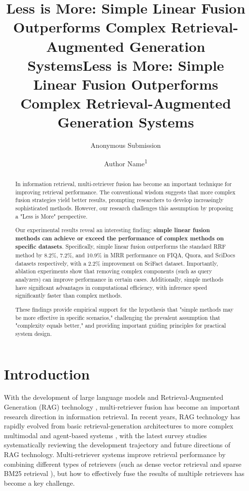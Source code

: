 \documentclass[letterpaper]{article} %
\title{Less is More: Simple Linear Fusion Outperforms Complex Retrieval-Augmented Generation Systems}
\title{Less is More: Simple Linear Fusion Outperforms Complex Retrieval-Augmented Generation Systems}
\author{
    Anonymous Submission
}
\author{
    Author Name\textsuperscript{\rm 1}
}
\begin{document}
\maketitle

\begin{abstract}
In information retrieval, multi-retriever fusion has become an important technique for improving retrieval performance. The conventional wisdom suggests that more complex fusion strategies yield better results, prompting researchers to develop increasingly sophisticated methods. However, our research challenges this assumption by proposing a "Less is More" perspective.

Our experimental results reveal an interesting finding: \textbf{simple linear fusion methods can achieve or exceed the performance of complex methods on specific datasets}. Specifically, simple linear fusion outperforms the standard RRF method by 8.2\%, 7.2\%, and 10.9\% in MRR performance on FIQA, Quora, and SciDocs datasets respectively, with a 2.2\% improvement on SciFact dataset. Importantly, ablation experiments show that removing complex components (such as query analyzers) can improve performance in certain cases. Additionally, simple methods have significant advantages in computational efficiency, with inference speed significantly faster than complex methods.

These findings provide empirical support for the hypothesis that "simple methods may be more effective in specific scenarios," challenging the prevalent assumption that "complexity equals better," and providing important guiding principles for practical system design.
\end{abstract}

\ifdefined\aaaianonymous
\else
\begin{links}
\end{links}
\fi

\section{Introduction}

With the development of large language models and Retrieval-Augmented Generation (RAG) technology \cite{lewis2020retrieval}, multi-retriever fusion has become an important research direction in information retrieval. In recent years, RAG technology has rapidly evolved from basic retrieval-generation architectures to more complex multimodal \cite{chen2022multimodal} and agent-based systems \cite{singh2025agentic}, with the latest survey studies \cite{gao2024retrieval} systematically reviewing the development trajectory and future directions of RAG technology. Multi-retriever systems improve retrieval performance by combining different types of retrievers (such as dense vector retrieval \cite{karpukhin2020dense} and sparse BM25 retrieval \cite{robertson2009probabilistic}), but how to effectively fuse the results of multiple retrievers has become a key challenge.
\end{document}
